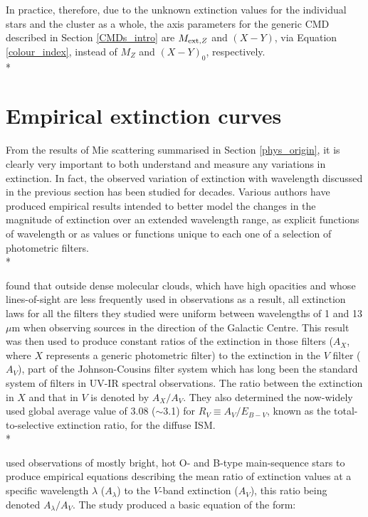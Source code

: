 \documentclass[12pt, a4paper]{report}
\begin{document}
In practice, therefore, due to the unknown extinction values for the individual stars and the cluster as a whole, the axis parameters for the generic CMD described in Section \ref{CMDs_intro} are $M_{\textnormal{ext},Z}$ and $(X-Y)$, via Equation \ref{colour_index}, instead of $M_{Z}$ and $(X-Y)_{0}$, respectively.\\*

\section{Empirical extinction curves} \label{empirical}

From the results of Mie scattering summarised in Section \ref{phys_origin}, it is clearly very important to both understand and measure any variations in extinction. In fact, the observed variation of extinction with wavelength discussed in the previous section has been studied for decades. Various authors have produced empirical results intended to better model the changes in the magnitude of extinction over an extended wavelength range, as explicit functions of wavelength or as values or functions unique to each one of a selection of photometric filters.\\*


\cite{1985ApJ...288..618R} found that outside dense molecular clouds, which have high opacities and whose lines-of-sight are less frequently used in observations as a result, all extinction laws for all the filters they studied were uniform between wavelengths of 1 and 13 $\mu$m when observing sources in the direction of the Galactic Centre. This result was then used to produce constant ratios of the extinction in those filters ($A_{X}$, where $X$ represents a generic photometric filter) to the extinction in the $V$ filter ($A_{V}$), part of the Johnson-Cousins \citep{1953ApJ...117..313J} filter system which has long been the standard system of filters in UV-IR spectral observations. The ratio between the extinction in $X$ and that in $V$ is denoted by $A_{X}/A_{V}$. They also determined the now-widely used global average value of 3.08 ($\sim$3.1) for $R_{V} \equiv A_{V}/E_{B-V}$, known as the total-to-selective extinction ratio,  for the diffuse ISM. \\*

\cite{1989ApJ...345..245C} used observations of mostly bright, hot O- and B-type main-sequence stars to produce empirical equations describing the mean ratio of extinction values at a specific wavelength $\lambda$ ($A_{\lambda}$) to the $V$-band extinction ($A_{V}$), this ratio being denoted $A_{\lambda}/A_{V}$. The study produced a basic equation of the form:
\end{document}
